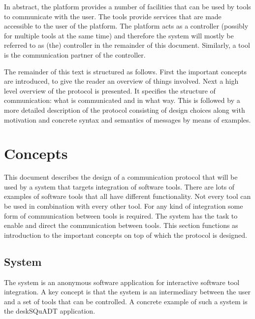 \documentclass{article}
\begin{document}
  In abstract, the platform provides a number of facilities that can be used by
  tools to communicate with the user. The tools provide services that are made
  accessible to the user of the platform. The platform acts as a controller
  (possibly for multiple tools at the same time) and therefore the system will
  mostly be referred to as (the) controller in the remainder of this document.
  Similarly, a tool is the communication partner of the controller.

  The remainder of this text is structured as follows. First the important
  concepts are introduced, to give the reader an overview of things involved.
  Next a high level overview of the protocol is presented. It specifies the
  structure of communication: what is communicated and in what way. This is
  followed by a more detailed description of the protocol consisting of design
  choices along with motivation and concrete syntax and semantics of messages
  by means of examples.


 \pagebreak

 \section{Concepts}

   This document describes the design of a communication protocol that will be
   used by a system that targets integration of software tools. There are lots
   of examples of software tools that all have different functionality. Not
   every tool can be used in combination with every other tool. For any kind of
   integration some form of communication between tools is required. The system
   has the task to enable and direct the communication between tools.  This
   section functions as introduction to the important concepts on top of which
   the protocol is designed.

  \subsection{System}

   The system is an anonymous software application for interactive software tool
   integration. A key concept is that the system is an intermediary between the
   user and a set of tools that can be controlled. A concrete example of such a
   system is the deskSQuADT application.
\end{document}
